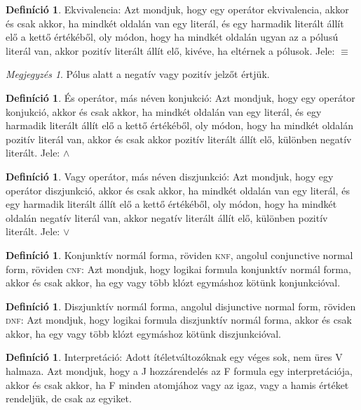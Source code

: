 \documentclass[
]{thesis-ekf}
\theoremstyle{definition}
\newtheorem{definicio}[tetel]{Definíció}
\theoremstyle{remark}
\newtheorem{megjegyzes}[tetel]{Megjegyzés}
\begin{document}
	\begin{definicio}
		Ekvivalencia: Azt mondjuk, hogy egy operátor ekvivalencia, akkor és csak akkor, ha mindkét oldalán van egy literál, és egy harmadik literált állít elő a kettő értékéből, oly módon, hogy ha mindkét oldalán ugyan az a pólusú literál van, akkor pozitív literált állít elő, kivéve, ha eltérnek a pólusok. Jele: $ \equiv $
	\end{definicio}

	\begin{megjegyzes}
		Pólus alatt a negatív vagy pozitív jelzőt értjük.
	\end{megjegyzes}

	\begin{definicio}
		És operátor, más néven konjukció: Azt mondjuk, hogy egy operátor konjukció, akkor és csak akkor, ha mindkét oldalán van egy literál, és egy harmadik literált állít elő a kettő értékéből, oly módon, hogy ha mindkét oldalán pozitív literál van, akkor és csak akkor pozitív literált állít elő, különben negatív literált. Jele: $\wedge$
	\end{definicio}

	\begin{definicio}
		Vagy operátor, más néven diszjunkció: Azt mondjuk, hogy egy operátor diszjunkció, akkor és csak akkor, ha mindkét oldalán van egy literál, és egy harmadik literált állít elő a kettő értékéből, oly módon, hogy ha mindkét oldalán negatív literál van, akkor negatív literált állít elő, különben pozitív literált. Jele: $\vee$
	\end{definicio}

	\begin{definicio}\label{cnf} %
		Konjunktív normál forma, röviden \textsc{knf}, angolul conjunctive normal form, röviden \textsc{cnf}: Azt mondjuk, hogy logikai formula konjunktív normál forma, akkor és csak akkor, ha egy vagy több klózt egymáshoz kötünk konjunkcióval.
	\end{definicio} %

	\begin{definicio}\label{dnf}
		Diszjunktív normál forma, angolul disjunctive normal form, röviden \textsc{dnf}: Azt mondjuk, hogy logikai formula diszjunktív normál forma, akkor és csak akkor, ha egy vagy több klózt egymáshoz kötünk diszjunkcióval.
	\end{definicio}

	\begin{definicio}
		Interpretáció: Adott ítéletváltozóknak egy véges sok, nem üres V halmaza.
		Azt mondjuk, hogy a J hozzárendelés az F formula egy interpretációja, akkor és csak akkor, ha F minden atomjához vagy az igaz, vagy a hamis értéket rendeljük, de csak az egyiket.
	\end{definicio}
\end{document}

